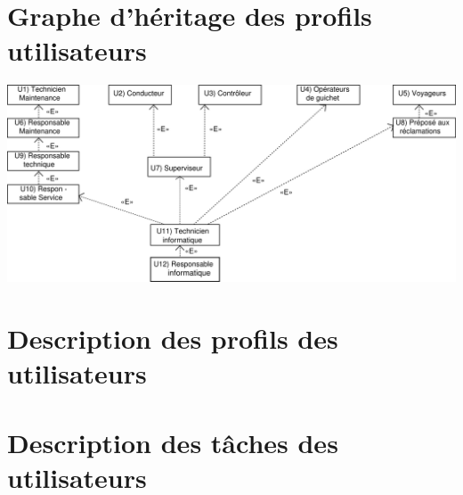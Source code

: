 \part{Graphe d'héritage des profils utilisateurs}
\includegraphics[width=\linewidth]{../../GPU/src/img/GPU.png}
\newpage

\part{Description des profils des utilisateurs}

\newpage

\part{Description des tâches des utilisateurs}

\newpage


